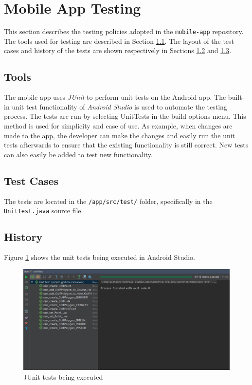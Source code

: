 \documentclass{article}
\begin{document}
    \newpage
    

    \section{Mobile App Testing}
    \label{sec:mobile-app}

    This section describes the testing policies adopted in the
    \texttt{mobile-app} repository. The tools used for testing are described in
    Section \ref{sec:ma-tools}.  The layout of the test cases and history of
    the tests are shown respectively in Sections \ref{sec:ma-cases} and
    \ref{sec:ma-hist}.

    \subsection{Tools}
    \label{sec:ma-tools}

    The mobile app uses \textit{JUnit} to perform unit tests on the Android
    app. The built-in unit test functionality of \textit{Android Studio} is
    used to automate the testing process. The tests are run by selecting
    UnitTests in the build options menu. This method is used for simplicity and
    ease of use.  As example, when changes are made to the app, the developer
    can make the changes and easily run the unit tests afterwards to ensure
    that the existing functionality is still correct.  New tests can also
    easily be added to test new functionality.

    \subsection{Test Cases}
    \label{sec:ma-cases}

    The tests are located in the \texttt{/app/src/test/} folder, specifically
    in the \texttt{UnitTest.java} source file.

    \subsection{History}
    \label{sec:ma-hist}

    Figure \ref{fig:junit} shows the unit tests being executed in Android
    Studio.

    \begin{figure}[H]
        \centering
        \includegraphics[scale=0.4]{AppUnitTest}
        \caption{JUnit tests being executed}
        \label{fig:junit}
    \end{figure}
\end{document}
